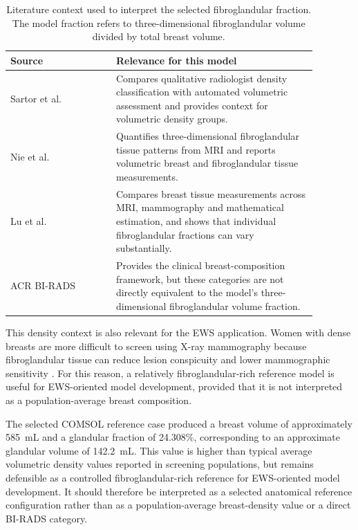 \begin{table}[H]
\centering
\caption{Literature context used to interpret the selected fibroglandular fraction. The model fraction refers to three-dimensional fibroglandular volume divided by total breast volume.}
\label{tab:appendix_glandular_fraction_reference}
\begin{tabular}{p{0.30\linewidth} p{0.58\linewidth}}
\toprule
Source & Relevance for this model \\
\midrule
Sartor et al. \cite{Sartor2016} & Compares qualitative radiologist density classification with automated volumetric assessment and provides context for volumetric density groups. \\
Nie et al. \cite{Nie2010} & Quantifies three-dimensional fibroglandular tissue patterns from MRI and reports volumetric breast and fibroglandular tissue measurements. \\
Lu et al. \cite{Lu2012} & Compares breast tissue measurements across MRI, mammography and mathematical estimation, and shows that individual fibroglandular fractions can vary substantially. \\
ACR BI-RADS \cite{ACRBIRADS} & Provides the clinical breast-composition framework, but these categories are not directly equivalent to the model's three-dimensional fibroglandular volume fraction. \\
\bottomrule
\end{tabular}
\end{table}

This density context is also relevant for the EWS application. Women with dense breasts are more difficult to screen using X-ray mammography because fibroglandular tissue can reduce lesion conspicuity and lower mammographic sensitivity \cite{VonEuler-Chelpin2019,Bakker2019}. For this reason, a relatively fibroglandular-rich reference model is useful for EWS-oriented model development, provided that it is not interpreted as a population-average breast composition.

The selected COMSOL reference case produced a breast volume of approximately 585~mL and a glandular fraction of 24.308\%, corresponding to an approximate glandular volume of 142.2~mL. This value is higher than typical average volumetric density values reported in screening populations, but remains defensible as a controlled fibroglandular-rich reference for EWS-oriented model development. It should therefore be interpreted as a selected anatomical reference configuration rather than as a population-average breast-density value or a direct BI-RADS category.

